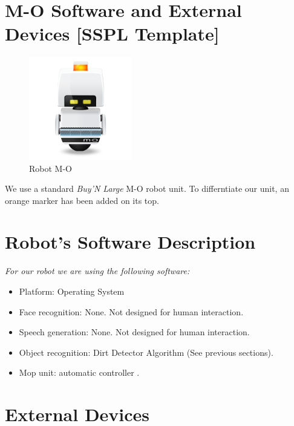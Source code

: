 \section*{M-O Software and External Devices [SSPL Template]}
\label{sec:annex-SSPL}

\setlength\intextsep{0pt}
\begin{figure}
	\centering
	\includegraphics[width=0.4\textwidth]{images/m-o.png}
	\caption{Robot M-O}
	\label{fig:m-o}
\end{figure}

We use a standard \textit{Buy'N Large} M-O robot unit. To differntiate our unit, an orange marker has been added on its top.

\section*{Robot's Software Description}

\textit{For our robot we are using the following software:}

\begin{itemize}
	\item Platform: \BnL Operating System
	\item Face recognition: None. Not designed for human interaction.
	\item Speech generation: None. Not designed for human interaction.
	\item Object recognition: \BnL Dirt Detector Algorithm (See previous sections).
	\item Mop unit: \BnL automatic controller \cite{bnl2}.
\end{itemize}

\section*{External Devices}

